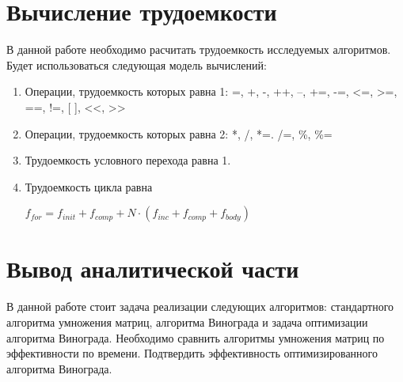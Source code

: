 \section{Вычисление трудоемкости}\label{Complexity}

В данной работе необходимо расчитать трудоемкость исследуемых алгоритмов.
Будет использоваться следующая модель вычислений:

\begin{enumerate}
  \item Операции, трудоемкость которых равна 1: =, +, -, ++, --, +=, -=, <=, >=, ==, !=, [ ], <<, >>
  \item Операции, трудоемкость которых равна 2: *, /, *=. /=, \%, \%=
  \item Трудоемкость условного перехода равна 1.
  \item Трудоемкость цикла равна 
  
  $f_{for} = f_{init} + f_{comp} + N\cdot(f_{inc} + f_{comp} + f_{body})$
\end{enumerate}

\section{Вывод аналитической части}\label{End_analis_chapter}

В данной работе стоит задача реализации следующих алгоритмов: стандартного алгоритма умножения матриц, алгоритма Винограда 
и задача оптимизации алгоритма Винограда. Необходимо сравнить алгоритмы умножения матриц по эффективности по времени.
Подтвердить эффективность оптимизированного алгоритма Винограда.
 

